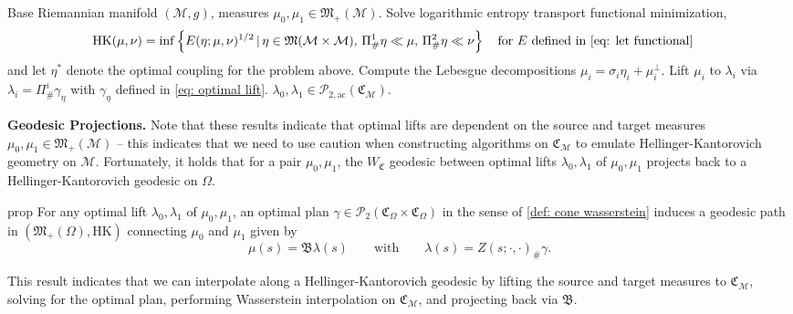\documentclass{article}
\newcommand{\man}{\mathcal{M}}
\begin{document}
\begin{algorithm}[H]
    \begin{algorithmic}[1] \label{alg: lift measures to cone}
        \caption{Lift measures from  $(\mathfrak{M}_+(\mathbb{\man}), \text{HK})$ to $(\mathcal{P}_{2, \text{ac}}(\mathfrak{C}_\man), W_2)$}
        \label{alg: let lift}
        \Require Base Riemannian manifold $(\man, g)$, measures $\mu_0, \mu_1 \in \mathfrak{M}_+(\man)$.  
        \State Solve logarithmic entropy transport functional minimization,
        \begin{align*} 
            \text{HK}(\mu, \nu) &= \inf\left\{E(\eta;\mu, \nu)^{1/2} \, |\, \eta  \in \mathfrak{M}(\man \times \man), \,\Pi^1_{\#}\eta  \ll \mu, \, \Pi^2_{\#}\eta \ll \nu\right\} \quad \text{for $E$ defined in \cref{eq: let functional}}
        \end{align*}
        and let $\eta^*$ denote the optimal coupling for the problem above. 
        \State Compute the Lebesgue decompositions $\mu_i = \sigma_i\eta_i + \mu_i^\perp$.
        \State Lift $\mu_i$ to $\lambda_i$ via $\lambda_i = \Pi^i_{\#}\gamma_{\eta}$ with $\gamma_{\eta}$ defined in \cref{eq: optimal lift}.
        \State \Return $\lambda_0, \lambda_1  \in \mathcal{P}_{2, \text{ac}}(\mathfrak{C}_{\man})$. 
    \end{algorithmic}
\end{algorithm}

\noindent \textbf{Geodesic Projections.} Note that these results indicate that optimal lifts are dependent on the source and target measures $\mu_0, \mu_1 \in \mathfrak{M}_+(\man)$ -- this indicates that we need to use caution when constructing algorithms on $\mathfrak{C}_\man$ to emulate Hellinger-Kantorovich geometry on $\man$. Fortunately, it holds that for a pair $\mu_0, \mu_1$, the $W_\mathfrak{C}$ geodesic between optimal lifts $\lambda_0, \lambda_1$ of $\mu_0, \mu_1$ projects back to a Hellinger-Kantorovich geodesic on $\Omega$. 

\begin{restatable}{prop}{} \label{cone geodesics project to hk geodesics}
    For any optimal lift $\lambda_0, \lambda_1$ of $\mu_0, \mu_1$, an optimal plan $\gamma \in \mathcal{P}_2(\mathfrak{C}_\Omega \times \mathfrak{C}_\Omega)$ in the sense of \cref{def: cone wasserstein} induces a geodesic path in $(\mathfrak{M}_+(\Omega), \text{HK})$ connecting $\mu_0$ and $\mu_1$ given by
    \[\mu(s) = \mathfrak{B}\lambda(s) \qquad \text{with} \qquad \lambda(s) = Z(s; \cdot, \cdot)_\#\gamma.\]
\end{restatable}
This result indicates that we can interpolate along a Hellinger-Kantorovich geodesic by lifting the source and target measures to $\mathfrak{C}_\man$, solving for the optimal plan, performing Wasserstein interpolation on $\mathfrak{C}_\man$, and projecting back via $\mathfrak{B}$.
\\
\end{document}

